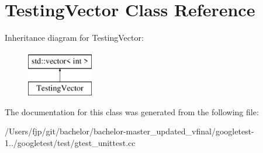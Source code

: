 \hypertarget{class_testing_vector}{}\section{Testing\+Vector Class Reference}
\label{class_testing_vector}
Inheritance diagram for Testing\+Vector\+:\begin{figure}[H]
\begin{center}
\leavevmode
\includegraphics[height=2.000000cm]{class_testing_vector}
\end{center}
\end{figure}


The documentation for this class was generated from the following file\+:\begin{DoxyCompactItemize}
\item 
/\+Users/fjp/git/bachelor/bachelor-\/master\+\_\+updated\+\_\+vfinal/googletest-\/1../googletest/test/gtest\+\_\+unittest.\+cc\end{DoxyCompactItemize}
